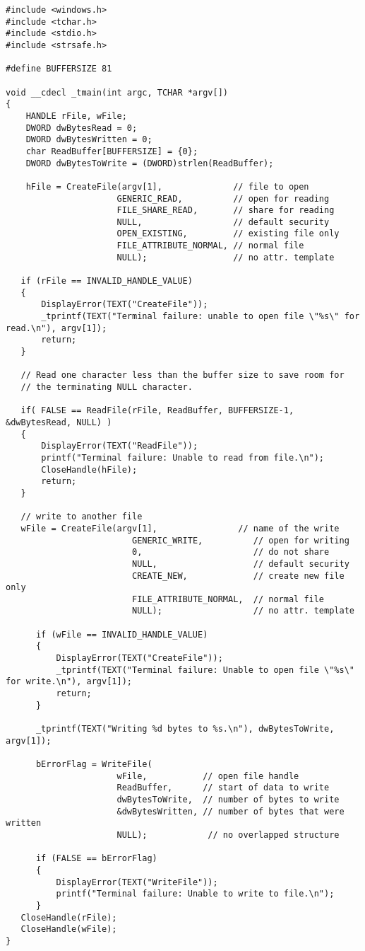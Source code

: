 \documentclass[10pt,draftclsnofoot,onecolumn,journal,compsoc]{IEEEtran}
\begin{document}
\begin{verbatim}
#include <windows.h>
#include <tchar.h>
#include <stdio.h>
#include <strsafe.h>

#define BUFFERSIZE 81

void __cdecl _tmain(int argc, TCHAR *argv[])
{
    HANDLE rFile, wFile; 
    DWORD dwBytesRead = 0;
	DWORD dwBytesWritten = 0;
    char ReadBuffer[BUFFERSIZE] = {0};
	DWORD dwBytesToWrite = (DWORD)strlen(ReadBuffer);
	
	hFile = CreateFile(argv[1],              // file to open
                      GENERIC_READ,          // open for reading
                      FILE_SHARE_READ,       // share for reading
                      NULL,                  // default security
                      OPEN_EXISTING,         // existing file only
                      FILE_ATTRIBUTE_NORMAL, // normal file
                      NULL);                 // no attr. template

   if (rFile == INVALID_HANDLE_VALUE) 
   { 
       DisplayError(TEXT("CreateFile"));
       _tprintf(TEXT("Terminal failure: unable to open file \"%s\" for read.\n"), argv[1]);
       return; 
   }

   // Read one character less than the buffer size to save room for
   // the terminating NULL character. 

   if( FALSE == ReadFile(rFile, ReadBuffer, BUFFERSIZE-1, &dwBytesRead, NULL) )
   {
       DisplayError(TEXT("ReadFile"));
       printf("Terminal failure: Unable to read from file.\n");
       CloseHandle(hFile);
       return;
   }
   
   // write to another file
   wFile = CreateFile(argv[1],                // name of the write
                         GENERIC_WRITE,          // open for writing
                         0,                      // do not share
                         NULL,                   // default security
                         CREATE_NEW,             // create new file only
                         FILE_ATTRIBUTE_NORMAL,  // normal file
                         NULL);                  // no attr. template

      if (wFile == INVALID_HANDLE_VALUE) 
      { 
          DisplayError(TEXT("CreateFile"));
          _tprintf(TEXT("Terminal failure: Unable to open file \"%s\" for write.\n"), argv[1]);
          return;
      }

      _tprintf(TEXT("Writing %d bytes to %s.\n"), dwBytesToWrite, argv[1]);

      bErrorFlag = WriteFile( 
                      wFile,           // open file handle
                      ReadBuffer,      // start of data to write
                      dwBytesToWrite,  // number of bytes to write
                      &dwBytesWritten, // number of bytes that were written
                      NULL);            // no overlapped structure

      if (FALSE == bErrorFlag)
      {
          DisplayError(TEXT("WriteFile"));
          printf("Terminal failure: Unable to write to file.\n");
      }
   CloseHandle(rFile);
   CloseHandle(wFile);
}
   
\end{verbatim}
\end{document}

